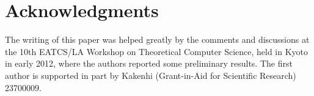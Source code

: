 \section*{Acknowledgments}

The writing of this paper was 
helped greatly by the comments and discussions at the 
10th EATCS/LA Workshop on Theoretical Computer Science, 
held in Kyoto in early 2012, 
where the authors reported some preliminary results. 
The first author is supported in part by 
Kakenhi (Grant-in-Aid for Scientific Research) 23700009.

